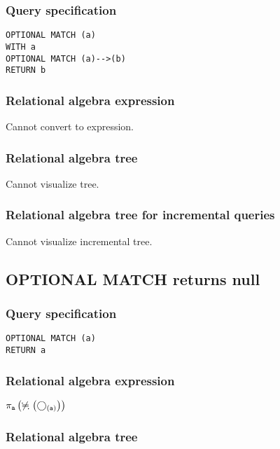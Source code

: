 \subsubsection*{Query specification}

\begin{lstlisting}
OPTIONAL MATCH (a)
WITH a
OPTIONAL MATCH (a)-->(b)
RETURN b
\end{lstlisting}

\subsubsection*{Relational algebra expression}

Cannot convert to expression.

\subsubsection*{Relational algebra tree}

Cannot visualize tree.

\subsubsection*{Relational algebra tree for incremental queries}

Cannot visualize incremental tree.

\subsection{OPTIONAL MATCH returns null}

\subsubsection*{Query specification}

\begin{lstlisting}
OPTIONAL MATCH (a)
RETURN a
\end{lstlisting}

\subsubsection*{Relational algebra expression}

$\projection{\var{a}} \left(\alldifferent{} \left(\getvertices{a}{}\right)\right)$

\subsubsection*{Relational algebra tree}

